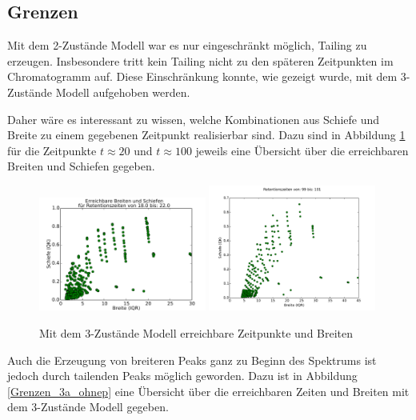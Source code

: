 \subsection{Grenzen}

Mit dem 2-Zustände Modell war es nur eingeschränkt möglich, Tailing zu erzeugen. Insbesondere tritt kein Tailing nicht zu den späteren Zeitpunkten im Chromatogramm auf. Diese Einschränkung konnte, wie gezeigt wurde, mit dem 3-Zustände Modell aufgehoben werden. 

Daher wäre es interessant zu wissen, welche Kombinationen aus Schiefe und Breite zu einem gegebenen Zeitpunkt realisierbar sind. Dazu sind in Abbildung \ref{3a_erreichbar} für die Zeitpunkte $t \approx 20$ und $ t \approx 100$ jeweils eine Übersicht über die erreichbaren Breiten und Schiefen gegeben.

\begin{figure}[h]
\centering
\includegraphics[width=0.49\textwidth]{bilder/t20erreichbar_1}
\includegraphics[width=0.49\textwidth]{bilder/t100erreichbar_1}
\caption{Mit dem 3-Zustände Modell erreichbare Zeitpunkte und Breiten}
\label{3a_erreichbar}
\end{figure}

Auch die Erzeugung von breiteren Peaks ganz zu Beginn des Spektrums ist jedoch durch tailenden Peaks möglich geworden. Dazu ist in Abbildung \ref{Grenzen_3a_ohnep} eine Übersicht über die erreichbaren Zeiten und Breiten mit dem 3-Zustände Modell gegeben.

